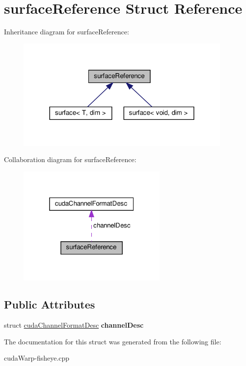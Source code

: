 \hypertarget{structsurfaceReference}{}\section{surface\+Reference Struct Reference}
\label{structsurfaceReference}


Inheritance diagram for surface\+Reference\+:\nopagebreak
\begin{figure}[H]
\begin{center}
\leavevmode
\includegraphics[width=300pt]{structsurfaceReference__inherit__graph}
\end{center}
\end{figure}


Collaboration diagram for surface\+Reference\+:\nopagebreak
\begin{figure}[H]
\begin{center}
\leavevmode
\includegraphics[width=208pt]{structsurfaceReference__coll__graph}
\end{center}
\end{figure}
\subsection*{Public Attributes}
\begin{DoxyCompactItemize}
\item 
struct \hyperlink{structcudaChannelFormatDesc}{cuda\+Channel\+Format\+Desc} {\bfseries channel\+Desc}\hypertarget{structsurfaceReference_abc896ed50f20111e99512112fc0db851}{}\label{structsurfaceReference_abc896ed50f20111e99512112fc0db851}

\end{DoxyCompactItemize}


The documentation for this struct was generated from the following file\+:\begin{DoxyCompactItemize}
\item 
cuda\+Warp-\/fisheye.\+cpp\end{DoxyCompactItemize}
